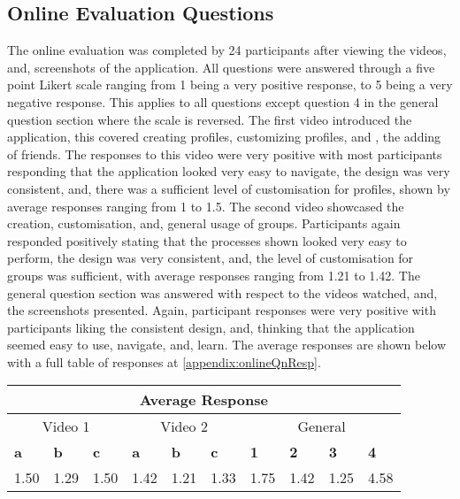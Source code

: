 \subsection{Online Evaluation Questions}

The online evaluation was completed by 24 participants after viewing the videos, and, screenshots of the application. All questions were answered through a five point Likert scale ranging from 1 being a very positive response, to 5 being a very negative response. This applies to all questions except question 4 in the general question section where the scale is reversed. The first video introduced the application, this covered creating profiles, customizing profiles, and , the adding of friends. The responses to this video were very positive with most participants responding that the application looked very easy to navigate, the design was very consistent, and, there was a sufficient level of customisation for profiles, shown by average responses ranging from 1 to 1.5. The second video showcased the creation, customisation, and, general usage of groups. Participants again responded positively stating that the processes shown looked very easy to perform, the design was very consistent, and, the level of customisation for groups was sufficient, with average responses ranging from 1.21 to 1.42. The general question section was answered with respect to the videos watched, and, the screenshots presented. Again, participant responses were very positive with participants liking the consistent design, and, thinking that the application seemed easy to use, navigate, and, learn. The average responses are shown below with a full table of responses at \ref{appendix:onlineQnResp}.

\begin{table}[!ht]
    \centering
    \begin{tabular}{|l|l|l||l|l|l||l|l|l|l|}
    \hline
    \multicolumn{10}{|c|}{Average Response } \\
    \hline
     \multicolumn{3}{|c||}{Video 1 } &
     \multicolumn{3}{|c||}{Video 2 } &
     \multicolumn{4}{|c|}{General } \\
    \hline
        \textbf{a} & \textbf{b} & \textbf{c} & \textbf{a} & \textbf{b} & \textbf{c} & \textbf{1} & \textbf{2} & \textbf{3} & \textbf{4} \\ \hline
    \hline
        1.50 & 1.29 & 1.50 & 1.42 & 1.21 & 1.33 & 1.75 & 1.42 & 1.25 & 4.58 \\ \hline
    \end{tabular}
\end{table}

